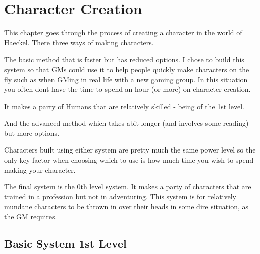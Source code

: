 
\chapter{Character Creation}\label{chargen}
\pagecolor{gray}\afterpage{\nopagecolor}



\newpage

\newpage
\begin{multicols}{2}
This chapter goes through the process of creating a character in the world of Haeckel. There three ways of making characters. 

The basic method that is faster but has reduced options. I chose to build this system so that GMs could use it to help people quickly make characters on the fly such as when GMing in real life with a new gaming group. In this situation you often dont have the time to spend an hour (or more) on character creation.

It makes a party of Humans that are relatively skilled - being of the 1st level.   

And the advanced method which takes abit longer (and involves some reading) but more options. 

Characters built using either system are pretty much the same power level so the only key factor when choosing which to use is how much time you wish to spend making your character. 

The final system is the 0th level system. It makes a party of characters that are trained in a profession but not in adventuring. This system is for relatively mundane characters to be thrown in over their heads in some dire situation, as the GM requires. 

\section{Basic System 1st Level}


\end{multicols}
